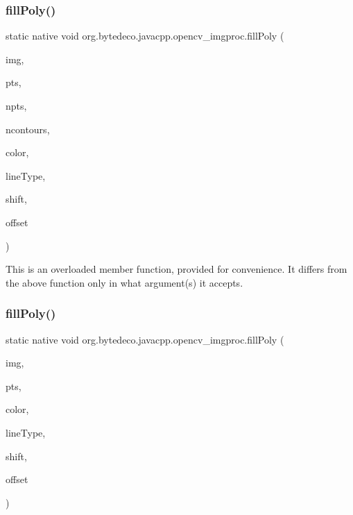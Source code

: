 \subsubsection{\texorpdfstring{fill\+Poly()}{fillPoly()}\hspace{0.1cm}{\footnotesize\ttfamily [1/2]}}
{\footnotesize\ttfamily static native void org.\+bytedeco.\+javacpp.\+opencv\+\_\+imgproc.\+fill\+Poly (\begin{DoxyParamCaption}\item[{@By\+Ref Mat}]{img,  }\item[{@Cast(\char`\"{}const cv\+::\+fr.antproject.utils.Point$\ast$$\ast$\char`\"{}) Pointer\+Pointer}]{pts,  }\item[{@Const Int\+Pointer}]{npts,  }\item[{int}]{ncontours,  }\item[{@Const @By\+Ref Scalar}]{color,  }\item[{int}]{line\+Type,  }\item[{int}]{shift,  }\item[{@By\+Val(null\+Value=\char`\"{}cv\+::\+fr.antproject.utils.Point()\char`\"{}) fr.antproject.utils.Point}]{offset }\end{DoxyParamCaption})\hspace{0.3cm}{\ttfamily [static]}}

This is an overloaded member function, provided for convenience. It differs from the above function only in what argument(s) it accepts. \mbox{\label{group__imgproc__draw_gaf4d0bf95bfbf1d3f0c4742d7486b3982}} 
\subsubsection{\texorpdfstring{fill\+Poly()}{fillPoly()}\hspace{0.1cm}{\footnotesize\ttfamily [2/2]}}
{\footnotesize\ttfamily static native void org.\+bytedeco.\+javacpp.\+opencv\+\_\+imgproc.\+fill\+Poly (\begin{DoxyParamCaption}\item[{@By\+Val Mat}]{img,  }\item[{@By\+Val Mat\+Vector}]{pts,  }\item[{@Const @By\+Ref Scalar}]{color,  }\item[{int}]{line\+Type,  }\item[{int}]{shift,  }\item[{@By\+Val(null\+Value=\char`\"{}cv\+::\+fr.antproject.utils.Point()\char`\"{}) fr.antproject.utils.Point}]{offset }\end{DoxyParamCaption})\hspace{0.3cm}{\ttfamily [static]}}



